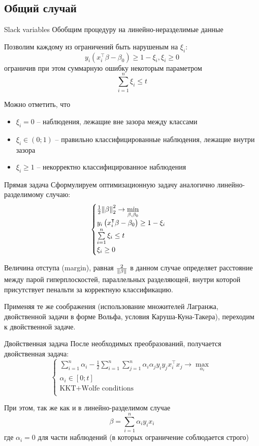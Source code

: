 \subsection{Общий случай}
\begin{frame}{Slack variables}
	Обобщим процедуру на линейно-неразделимые данные

	Позволим каждому из ограничений быть нарушеным на $\xi_i$:
	$$y_i\left(x_i^\intercal \beta - \beta_0\right) \geq 1 - \xi_i, \xi_i \geq 0$$
	ограничив при этом суммарную ошибку некоторым параметром 
	$$\sum\limits_{i=1}^n \xi_i \leq t$$

	Можно отметить, что
	\begin{itemize}
		\item $\xi_i = 0$ -- наблюдения, лежащие вне зазора между классами
		\item $\xi_i \in \left(0; 1\right)$ -- правильно классифицированные наблюдения, лежащие внутри зазора
		\item $\xi_i \geq 1$ -- некорректно классифицированное наблюдения
	\end{itemize}

\end{frame}

\begin{frame}{Прямая задача}
	Сформулируем оптимизационную задачу аналогично линейно-разделимому случаю:
	$$
	\begin{cases}
		\frac{1}{2}\norm{\beta}_2^2\rightarrow \min\limits_{\beta,\beta_0} \\
		y_i\left(x_i^\intercal \beta - \beta_0\right) \geq 1 - \xi_i \\
		\sum\limits_{i=1}^n\xi_i \leq t \\
		\xi_i\geq 0 \\
	\end{cases}
	$$

    Величина отступа (margin), равная $\frac{2}{\norm{\beta}}$ в данном случае определяет расстояние между парой гиперплоскостей, параллельных разделяющей,
внутри которой присутствует пенальти за корректную классификацию.

	Применяя те же соображения (использование множителей Лагранжа, двойственной задачи в форме Вольфа, условия Каруша-Куна-Такера), переходим к двойственной задаче.

\end{frame}

\begin{frame}{Двойственная задача}
	После необходимых преобразований, получается двойственная задача:
	$$
	\begin{cases}
		\sum\limits_{i=1}^{n}\alpha_i - \frac{1}{2}\sum\limits_{i=1}^n\sum\limits_{j=1}^n\alpha_i\alpha_jy_iy_jx_i^\intercal x_j \rightarrow \max\limits_{\alpha_i} \\
		\alpha_i\in\left[0; t\right] \\
		\text{KKT+Wolfe conditions} \\
	\end{cases}
	$$

	При этом, так же как и в линейно-разделимом случае
	$$ \beta = \sum_{i=1}^n \alpha_i y_i x_i $$
	где $\alpha_i=0$ для части наблюдений (в которых ограничение соблюдается строго)
\end{frame}

